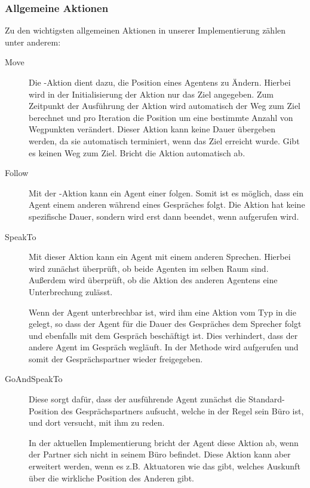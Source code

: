 \subsubsection{Allgemeine Aktionen}
Zu den wichtigsten allgemeinen Aktionen in unserer Implementierung zählen unter anderem:
\begin{description}
	\item[Move] Die -Aktion dient dazu, die Position eines Agentens zu Ändern. Hierbei wird in der Initialisierung der Aktion nur das Ziel angegeben. Zum Zeitpunkt der Ausführung der Aktion wird automatisch der Weg zum Ziel berechnet und pro Iteration die Position um eine bestimmte Anzahl von Wegpunkten verändert. Dieser Aktion kann keine Dauer übergeben werden, da sie automatisch terminiert, wenn das Ziel erreicht wurde. Gibt es keinen Weg zum Ziel. Bricht die Aktion automatisch ab.
	\item[Follow] Mit der -Aktion kann ein Agent einer    folgen. Somit ist es möglich, dass ein Agent einem anderen während eines Gespräches folgt. Die Aktion hat keine spezifische Dauer, sondern wird erst dann beendet, wenn  aufgerufen wird.
	\item[SpeakTo] Mit dieser Aktion kann ein Agent mit einem anderen Sprechen. Hierbei wird zunächst überprüft, ob beide Agenten im selben Raum sind. Außerdem wird überprüft, ob die Aktion des anderen Agentens eine Unterbrechung zulässt.
	
	Wenn der Agent unterbrechbar ist, wird ihm eine Aktion vom Typ  in die  gelegt, so dass der Agent für die Dauer des Gespräches dem Sprecher folgt und ebenfalls mit dem Gespräch beschäftigt ist. Dies verhindert, dass der andere Agent im Gespräch wegläuft. In der Methode  wird  aufgerufen und somit der Gesprächspartner wieder freigegeben.
	\item[GoAndSpeakTo] Diese  sorgt dafür, dass der ausführende Agent zunächst die Standard-Position des Gesprächspartners aufsucht, welche in der Regel sein Büro ist, und dort versucht, mit ihm zu reden. 
	
	In der aktuellen Implementierung bricht der Agent diese Aktion ab, wenn der Partner sich nicht in seinem Büro befindet. Diese Aktion kann aber erweitert werden, wenn es z.B. Aktuatoren wie das  gibt, welches Auskunft über die wirkliche Position des Anderen gibt.
\end{description}
